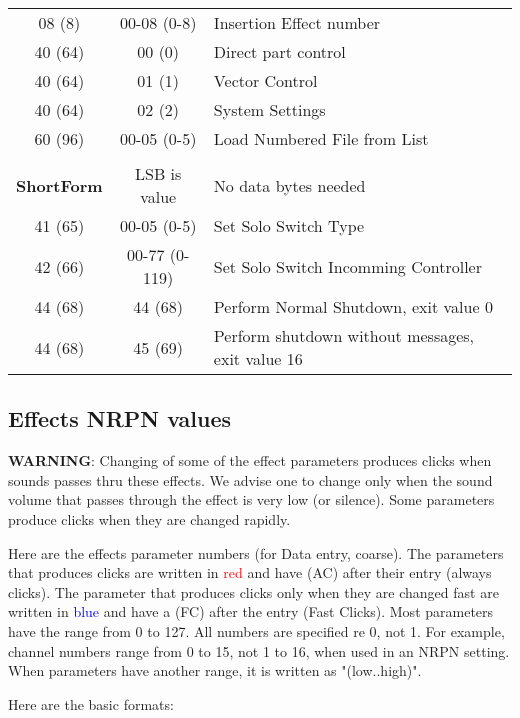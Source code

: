 \begin{table}[H]
\begin{tabular}{c c l}
        08 (8) & 00-08 (0-8)& Insertion Effect number \\
        40 (64) & 00 (0) & Direct part control \\
        40 (64) & 01 (1) & Vector Control \\
        40 (64) & 02 (2) & System Settings \\
        60 (96) & 00-05 (0-5) & Load Numbered File from List \\
        \\
    \textbf{ShortForm} &  LSB is value & No data bytes needed \\
        41 (65) & 00-05 (0-5) & Set Solo Switch Type \\
        42 (66) & 00-77 (0-119) & Set Solo Switch Incomming Controller \\
        44 (68) & 44 (68) & Perform Normal Shutdown, exit value 0 \\
        44 (68) & 45 (69) & Perform shutdown without messages, exit value 16 \\
      \end{tabular}
   \end{table}

\subsection{Effects NRPN values}
\label{subsection:effects_nrpn_values}
   \textbf{WARNING}:
   Changing of some of the effect parameters produces clicks when sounds
   passes thru these effects.  We advise one to change only when the sound
   volume that passes through the effect is very low (or silence).  Some
   parameters produce clicks when they are changed rapidly.

   Here are the effects parameter numbers (for Data entry, coarse).
   The parameters that produces clicks are written in \textcolor{red}{red}
   and have (AC) after their entry (always clicks).
   The parameter that produces clicks only when they are changed fast are
   written in \textcolor{blue}{blue} and have a (FC) after the entry (Fast
   Clicks).
   Most parameters have the range from 0 to 127.  All numbers are specified re 0,
   not 1.  For example, channel numbers range from 0 to 15, not 1 to 16, when
   used in an NRPN setting.
   When parameters have another range, it is written as "(low..high)".

   Here are the basic formats:

